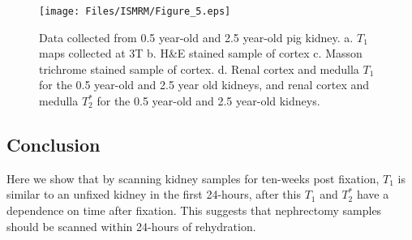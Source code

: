 \begin{figure}[H]
	\centering
	\texttt{[image: Files/ISMRM/Figure\_5.eps]}
	\caption{ Data collected from 0.5 year-old and 2.5 year-old pig kidney. a. $T_1$ maps collected at 3T b.  H\&E stained sample of cortex c. Masson trichrome stained sample of cortex. d. Renal cortex and medulla $T_1$ for the 0.5 year-old and 2.5 year old kidneys, and renal cortex and medulla $T_2^*$ for the 0.5 year-old and 2.5 year-old kidneys. }
	\label{fig:ISMRM_Fig_5}
\end{figure}

\subsection*{Conclusion}

Here we show that by scanning kidney samples for ten-weeks post fixation, $T_1$ is similar to an unfixed kidney in the first 24-hours, after this $T_1$ and $T_2^*$ have a dependence on time after fixation. This suggests that nephrectomy samples should be scanned within 24-hours of rehydration.
